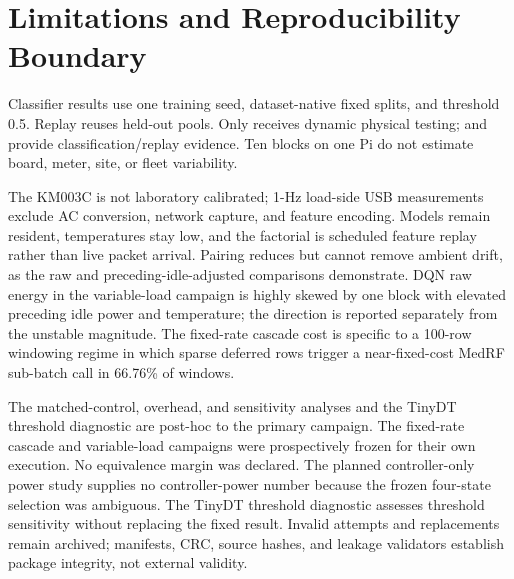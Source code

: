 \section{Limitations and Reproducibility Boundary}
Classifier results use one training seed, dataset-native fixed splits, and threshold 0.5. Replay reuses held-out pools. Only \ton{} receives dynamic physical testing; \cic{} and \nb{} provide classification/replay evidence. Ten blocks on one Pi do not estimate board, meter, site, or fleet variability.

The KM003C is not laboratory calibrated; 1-Hz load-side USB measurements exclude AC conversion, network capture, and feature encoding. Models remain resident, temperatures stay low, and the factorial is scheduled feature replay rather than live packet arrival. Pairing reduces but cannot remove ambient drift, as the raw and preceding-idle-adjusted comparisons demonstrate. DQN raw energy in the variable-load campaign is highly skewed by one block with elevated preceding idle power and temperature; the direction is reported separately from the unstable magnitude. The fixed-rate cascade cost is specific to a 100-row windowing regime in which sparse deferred rows trigger a near-fixed-cost MedRF sub-batch call in 66.76\% of windows.

The matched-control, overhead, and sensitivity analyses and the TinyDT threshold diagnostic are post-hoc to the primary campaign. The fixed-rate cascade and variable-load campaigns were prospectively frozen for their own execution. No equivalence margin was declared. The planned controller-only power study supplies no controller-power number because the frozen four-state selection was ambiguous. The TinyDT threshold diagnostic assesses threshold sensitivity without replacing the fixed result. Invalid attempts and replacements remain archived; manifests, CRC, source hashes, and leakage validators establish package integrity, not external validity.
